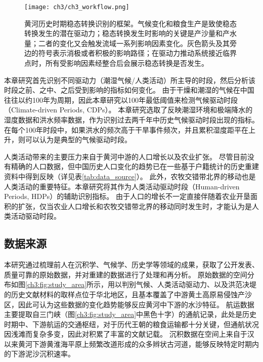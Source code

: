 \begin{figure}[htb] %
    \centering
    \texttt{[image: ch3/ch3\_workflow.png]}
    \caption[黄河历史时期水沙特征的稳态转换识别框架]{黄河历史时期稳态转换识别的框架。气候变化和粮食生产是致使稳态转换发生的潜在驱动力；稳态转换发生时影响的关键是产沙量和产水量；二者的变化又会触发流域一系列影响因素变化。灰色箭头及其旁边的符号表示消极或者积极的影响路径；在驱动力推动系统接近临界点时，所有受影响因素经整合后会展示稳态转换是否发生。}\label{fig:ch3:regime_shift_detect}
\end{figure}


本章研究首先识别不同驱动力（潮湿气候/人类活动）所主导的时段，然后分析该时段之前、之中、之后受到影响的指标如何变化。
由于干燥和潮湿的气候在中国往往以约100年为周期\cite{GeQuanSheng2011}，因此本章研究以100年最低阈值来检测气候驱动时段（Climate-driven Periods, CDPs）。
本章研究选取了反映潮湿环境和极端降水的湿度数据和洪水频率数据，作为识别过去两千年中历史气候驱动时段出现的指标。
在每个100年时段中，如果洪水的频次高于干旱事件频次，并且累积湿度距平在上升，则可以认为是典型的气候驱动时段。

人类活动带来的主要压力来自于黄河中游的人口增长以及农业扩张。
尽管目前没有精确的人口数据，但中国历史人口变化的趋势已在一些基于户籍统计的历史重建资料中得到反映（详见表\ref{tab:data_source}）。
此外，农牧交错带北界的移动也是人类活动的重要特征。本章研究将其作为人类活动驱动时段（Human-driven Periods, HDPs）的辅助识别指标。
由于人口的增长不一定直接伴随着农业开垦面积的扩张，仅当农业人口增长和农牧交错带北界的移动同时发生时，才能认为是人类活动驱动时段。

\subsection{数据来源}

本研究通过梳理前人在沉积学、气候学、历史学等领域的成果，获取了公开发表、质量可靠的原始数据，并对重建的数据进行了处理和再分析。
原始数据的空间分布如图\ref{ch3:fig:study_area}所示，用以判别气候、人类活动驱动力、以及洪范决堤的历史文献材料的取样点位于华北地区，且基本覆盖了中游黄土高原易侵蚀产沙区，因此可认为这些数据的变化趋势能够反应黄河中下游的水沙特征。
航运数据主要提取自三门峡（图\ref{ch3:fig:study_area}中黑色十字）的通航记录，此处是历史时期中、下游航运的交通枢纽，对于历代王朝的粮食运输都十分关键，但通航状况因浅滩而复杂多变，因此对积累了丰富的文献记载。
沉积数据在空间上来自于汉以来黄河下游黄淮海平原上频繁改道形成的众多辫状古河道\cite{shaoshixiong1989}，能够反映特定时期内的下游泥沙沉积速率。

